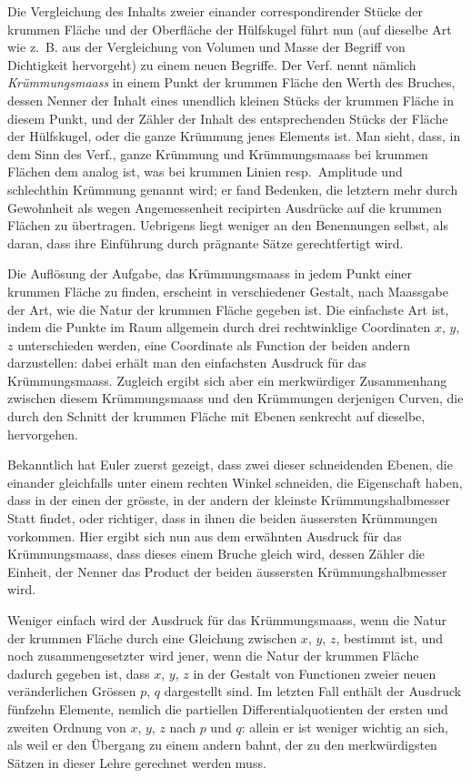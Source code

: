 \documentclass[fontsize=10pt,paper=a5,pagesize,headings=small,headinclude=true,footinclude=true]{scrbook}
\begin{document}
Die Vergleichung des Inhalts zweier einander correspondirender Stücke der krummen Fläche und der Oberfläche der Hülfskugel führt nun (auf dieselbe Art wie z.~B. aus der Vergleichung von Volumen und Masse der Begriff von Dichtigkeit hervorgeht) zu einem neuen Begriffe. Der Verf. nennt nämlich \textit{Krümmungsmaass} in einem Punkt der krummen Fläche den Werth des Bruches, dessen Nenner der Inhalt eines unendlich kleinen Stücks der krummen Fläche in diesem Punkt, und der Zähler der Inhalt des entsprechenden Stücks der Fläche der Hülfskugel, oder die ganze Krümmung jenes Elements ist. Man sieht, dass, in dem Sinn des Verf., ganze Krümmung und Krümmungsmaass bei krummen Flächen dem analog ist, was bei krummen Linien resp.~Amplitude und schlechthin Krümmung genannt wird; er fand Bedenken, die letztern mehr durch Gewohnheit als wegen Angemessenheit recipirten Ausdrücke auf die krummen Flächen zu übertragen. Uebrigens liegt weniger an den Benennungen selbst, als daran, dass ihre Einführung durch prägnante Sätze gerechtfertigt wird.

Die Auflösung der Aufgabe, das Krümmungsmaass in jedem Punkt einer krummen Fläche zu finden, erscheint in verschiedener Gestalt, nach Maassgabe der Art, wie die Natur der krummen Fläche gegeben ist. Die einfachste Art ist, indem die Punkte im Raum allgemein durch drei rechtwinklige Coordinaten $x$, $y$, $z$ unterschieden werden, eine Coordinate als Function der beiden andern darzustellen: dabei erhält man den einfachsten Ausdruck für das Krümmungsmaass. Zugleich ergibt sich aber ein merkwürdiger Zusammenhang zwischen diesem Krümmungsmaass und den Krümmungen derjenigen Curven, die durch den Schnitt der krummen Fläche mit Ebenen senkrecht auf dieselbe, hervorgehen.

Bekanntlich hat Euler zuerst gezeigt, dass zwei dieser schneidenden Ebenen, die einander gleichfalls unter einem rechten Winkel schneiden, die Eigenschaft haben, dass in der einen der grösste, in der andern der kleinste Krümmungshalbmesser Statt findet, oder richtiger, dass in ihnen die beiden äussersten Krümmungen vorkommen. Hier ergibt sich nun aus dem erwähnten Ausdruck für das Krümmungsmaass, dass dieses einem Bruche gleich wird, dessen Zähler die Einheit, der Nenner das Product der beiden äussersten Krümmungshalbmesser wird.

Weniger einfach wird der Ausdruck für das Krümmungsmaass, wenn die Natur der krummen Fläche durch eine Gleichung zwischen $x$, $y$, $z$, bestimmt ist, und noch zusammengesetzter wird jener, wenn die Natur der krummen Fläche dadurch gegeben ist, dass $x$, $y$, $z$ in der Gestalt von Functionen zweier neuen veränderlichen Grössen $p$, $q$ dargestellt sind. Im letzten Fall enthält der Ausdruck fünfzehn Elemente, nemlich die partiellen Differentialquotienten der ersten und zweiten Ordnung von $x$, $y$, $z$ nach $p$ und $q$: allein er ist weniger wichtig an sich, als weil er den Übergang zu einem andern bahnt, der zu den merkwürdigsten Sätzen in dieser Lehre gerechnet werden muss.
\end{document}
